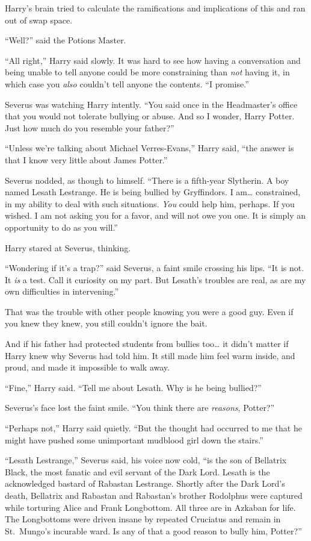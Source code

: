 Harry's brain tried to calculate the ramifications and implications of
this and ran out of swap space.

``Well?'' said the Potions Master.

``All right,'' Harry said slowly. It was hard to see how having a
conversation and being unable to tell anyone could be more constraining
than \emph{not} having it, in which case you \emph{also} couldn't tell
anyone the contents. ``I promise.''

Severus was watching Harry intently. ``You said once in the Headmaster's
office that you would not tolerate bullying or abuse. And so I wonder,
Harry Potter. Just how much do you resemble your father?''

``Unless we're talking about Michael Verres-Evans,'' Harry said, ``the
answer is that I know very little about James Potter.''

Severus nodded, as though to himself. ``There is a fifth-year Slytherin.
A boy named Lesath Lestrange. He is being bullied by Gryffindors. I
am\ldots{} constrained, in my ability to deal with such situations.
\emph{You} could help him, perhaps. If you wished. I am not asking you
for a favor, and will not owe you one. It is simply an opportunity to do
as you will.''

Harry stared at Severus, thinking.

``Wondering if it's a trap?'' said Severus, a faint smile crossing his
lips. ``It is not. It \emph{is} a test. Call it curiosity on my part.
But Lesath's troubles are real, as are my own difficulties in
intervening.''

That was the trouble with other people knowing you were a good guy. Even
if you knew they knew, you still couldn't ignore the bait.

And if his father had protected students from bullies too\ldots{} it
didn't matter if Harry knew why Severus had told him. It still made him
feel warm inside, and proud, and made it impossible to walk away.

``Fine,'' Harry said. ``Tell me about Lesath. Why is he being bullied?''

Severus's face lost the faint smile. ``You think there are
\emph{reasons}, Potter?''

``Perhaps not,'' Harry said quietly. ``But the thought had occurred to
me that he might have pushed some unimportant mudblood girl down the
stairs.''

``Lesath Lestrange,'' Severus said, his voice now cold, ``is the son of
Bellatrix Black, the most fanatic and evil servant of the Dark Lord.
Lesath is the acknowledged bastard of Rabastan Lestrange. Shortly after
the Dark Lord's death, Bellatrix and Rabastan and Rabastan's brother
Rodolphus were captured while torturing Alice and Frank Longbottom. All
three are in Azkaban for life. The Longbottoms were driven insane by
repeated Cruciatus and remain in St.~Mungo's incurable ward. Is any of
that a good reason to bully him, Potter?''

